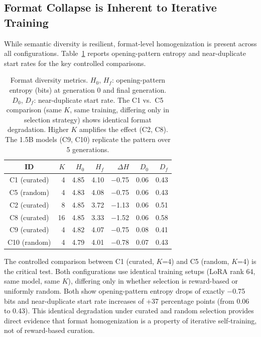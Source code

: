 \documentclass[11pt,a4paper]{article}
\begin{document}
\subsection{Format Collapse is Inherent to Iterative Training}
\label{sec:format}

While semantic diversity is resilient, format-level homogenization is present across all configurations. Table~\ref{tab:format} reports opening-pattern entropy and near-duplicate start rates for the key controlled comparisons.

\begin{table}[t]
\centering
\caption{Format diversity metrics. $H_0$, $H_f$: opening-pattern entropy (bits) at generation 0 and final generation. $D_0$, $D_f$: near-duplicate start rate. The C1 vs.\ C5 comparison (same $K$, same training, differing only in selection strategy) shows identical format degradation. Higher $K$ amplifies the effect (C2, C8). The 1.5B models (C9, C10) replicate the pattern over 5 generations.}
\label{tab:format}
\footnotesize
\begin{tabular}{crrrrrr}
\toprule
ID & $K$ & $H_0$ & $H_f$ & $\Delta H$ & $D_0$ & $D_f$ \\
\midrule
C1 (curated) & 4 & 4.85 & 4.10 & $-$0.75 & 0.06 & 0.43 \\
C5 (random) & 4 & 4.83 & 4.08 & $-$0.75 & 0.06 & 0.43 \\
\midrule
C2 (curated) & 8 & 4.85 & 3.72 & $-$1.13 & 0.06 & 0.51 \\
C8 (curated) & 16 & 4.85 & 3.33 & $-$1.52 & 0.06 & 0.58 \\
\midrule
C9 (curated) & 4 & 4.82 & 4.07 & $-$0.75 & 0.08 & 0.41 \\
C10 (random) & 4 & 4.79 & 4.01 & $-$0.78 & 0.07 & 0.43 \\
\bottomrule
\end{tabular}
\end{table}

The controlled comparison between C1 (curated, $K$=4) and C5 (random, $K$=4) is the critical test. Both configurations use identical training setups (LoRA rank 64, same model, same $K$), differing only in whether selection is reward-based or uniformly random. Both show opening-pattern entropy drops of exactly $-$0.75 bits and near-duplicate start rate increases of +37 percentage points (from 0.06 to 0.43). This identical degradation under curated and random selection provides direct evidence that format homogenization is a property of iterative self-training, not of reward-based curation.
\end{document}
